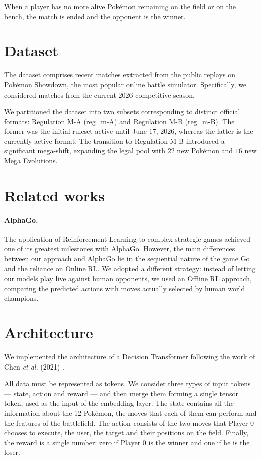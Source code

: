 \documentclass{article}
\begin{document}
When a player has no more alive Pokémon remaining on the field or on the bench, the match is ended and the opponent is the winner. 
\section{Dataset}
The dataset comprises recent matches extracted from the public replays on Pokémon Showdown, the most popular online battle simulator. Specifically, we considered matches from the current $2026$ competitive season.

We partitioned the dataset into two subsets corresponding to distinct official formats: Regulation M-A (reg\_m-A) and Regulation M-B (reg\_m-B). The former was the initial ruleset active until June $17$, $2026$, whereas the latter is the currently active format. The transition to Regulation M-B introduced a significant mega-shift, expanding the legal pool with $22$ new Pokémon and $16$ new Mega Evolutions.



\section{Related works}
\paragraph*{AlphaGo.} 
The application of Reinforcement Learning to complex strategic games achieved one of its greatest milestones with AlphaGo. However, the main differences between our approach and  AlphaGo lie in the sequential nature of the game Go and the reliance on Online RL. We adopted a different strategy: instead of letting our models play live against human opponents, we used an Offline RL approach, comparing the predicted actions with moves actually selected by human world champions.


\section{Architecture}
We implemented the architecture of a Decision Transformer following the work of Chen \textit{et al.} (2021) \cite{chen2021decision}. 

All data must be represented as tokens. We consider three types of input tokens --- state, action and reward --- and then merge them forming a single tensor token, used as the input of the embedding layer. The state contains all the information about the 12 Pokémon, the moves that each of them can perform and the features of the battlefield. The action consists of the two moves that Player 0 chooses to execute, the user, the target and their positions on the field. Finally, the reward is a single number: zero if Player 0 is the winner and one if he is the loser. 
\end{document}
